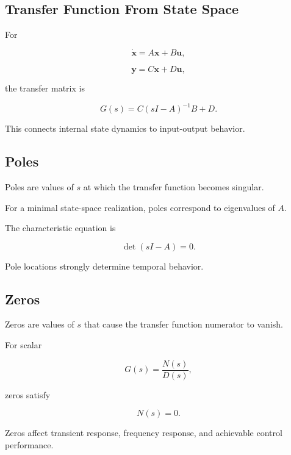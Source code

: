 \subsection{Transfer Function From State Space}
\label{subsec:state-space-transfer-function}

For

\[
\dot{\mathbf{x}}
=
A\mathbf{x}+B\mathbf{u},
\]

\[
\mathbf{y}
=
C\mathbf{x}+D\mathbf{u},
\]

the transfer matrix is

\[
\boxed{
G(s)
=
C(sI-A)^{-1}B+D.
}
\]

This connects internal state dynamics to input-output behavior.

\subsection{Poles}
\label{subsec:control-poles}

Poles are values of \(s\) at which the transfer function becomes singular.

For a minimal state-space realization, poles correspond to eigenvalues of
\(A\).

The characteristic equation is

\[
\boxed{
\det(sI-A)=0.
}
\]

Pole locations strongly determine temporal behavior.

\subsection{Zeros}
\label{subsec:control-zeros}

Zeros are values of \(s\) that cause the transfer function numerator to
vanish.

For scalar

\[
G(s)
=
\frac{N(s)}{D(s)},
\]

zeros satisfy

\[
\boxed{
N(s)=0.
}
\]

Zeros affect transient response, frequency response, and achievable control
performance.


